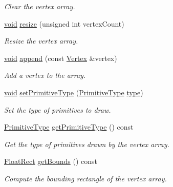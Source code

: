 \begin{DoxyCompactItemize}
\begin{DoxyCompactList}\small\item\em Clear the vertex array. \end{DoxyCompactList}\item 
\hyperlink{glutf90_8h_ac778d6f63f1aaf8ebda0ce6ac821b56e}{void} \hyperlink{classsf_1_1_vertex_array_a9884c43c4f5ba152046ab3a5c91efb3b}{resize} (unsigned int vertex\-Count)
\begin{DoxyCompactList}\small\item\em Resize the vertex array. \end{DoxyCompactList}\item 
\hyperlink{glutf90_8h_ac778d6f63f1aaf8ebda0ce6ac821b56e}{void} \hyperlink{classsf_1_1_vertex_array_a80c8f6865e53bd21fc6cb10fffa10035}{append} (const \hyperlink{classsf_1_1_vertex}{Vertex} \&vertex)
\begin{DoxyCompactList}\small\item\em Add a vertex to the array. \end{DoxyCompactList}\item 
\hyperlink{glutf90_8h_ac778d6f63f1aaf8ebda0ce6ac821b56e}{void} \hyperlink{classsf_1_1_vertex_array_aa38c10707c28a97f4627ae8b2f3ad969}{set\-Primitive\-Type} (\hyperlink{group__graphics_ga5ee56ac1339984909610713096283b1b}{Primitive\-Type} \hyperlink{gl3_8h_a984aabed544368e7fe0e566d7cf014a7}{type})
\begin{DoxyCompactList}\small\item\em Set the type of primitives to draw. \end{DoxyCompactList}\item 
\hyperlink{group__graphics_ga5ee56ac1339984909610713096283b1b}{Primitive\-Type} \hyperlink{classsf_1_1_vertex_array_af2205f76fe98fb3cf1f303f25d43c045}{get\-Primitive\-Type} () const 
\begin{DoxyCompactList}\small\item\em Get the type of primitives drawn by the vertex array. \end{DoxyCompactList}\item 
\hyperlink{namespacesf_aed4e58f586b2eed2621c0365d0b7554e}{Float\-Rect} \hyperlink{classsf_1_1_vertex_array_a741d1b1acbb175289eab37bbf49cbb24}{get\-Bounds} () const 
\begin{DoxyCompactList}\small\item\em Compute the bounding rectangle of the vertex array. \end{DoxyCompactList}\end{DoxyCompactItemize}



